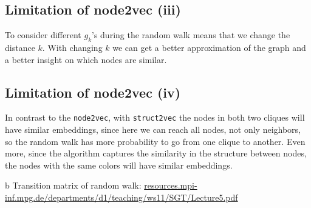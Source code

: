 \documentclass[a4paper,11pt]{article}
\begin{document}

\subsection{Limitation of node2vec (iii)}

To consider different $g_k$'s during the random walk means that we change the distance $k$. 
With changing $k$ we can get a better approximation of the graph 
and a better insight on which nodes are similar.




\subsection{Limitation of node2vec (iv)}

In contrast to the \texttt{node2vec}, with \texttt{struct2vec} the nodes in both two cliques will have similar embeddings, since here we can reach all nodes, not only neighbors, so the random walk has more probability to go from one clique to another.
Even more, since the algorithm captures the similarity in the structure between nodes, the nodes with the same colors will have similar embeddings.



\begin{thebibliography}{99}
    \bibitem b Transition matrix of random walk: \url{resources.mpi-inf.mpg.de/departments/d1/teaching/ws11/SGT/Lecture5.pdf}
\end{thebibliography}
\end{document}
